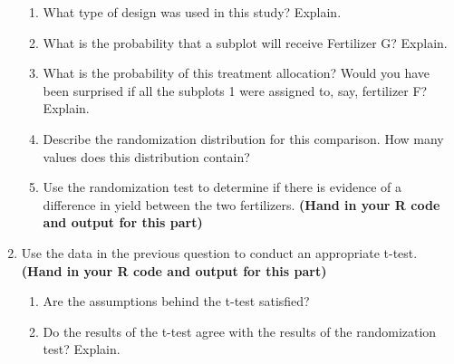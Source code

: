 \documentclass[11pt, oneside]{article}   	%
\begin{document}
\begin{enumerate}
\begin{enumerate}
\item What type of design was used in this study?  Explain.
\item What is the probability that a subplot will receive Fertilizer G?  Explain.
\item What is the probability of this treatment allocation?  Would you have been surprised if all the subplots 1 were assigned to, say, fertilizer F?  Explain.
\item Describe the randomization distribution for this comparison.  How many values does this distribution contain?
\item Use the randomization test to determine if there is evidence of a difference in yield between the two fertilizers.  {\bf (Hand in your R code and output for this part)}
\end{enumerate}

\item Use the data in the previous question to conduct an appropriate t-test.  {\bf (Hand in your R code and output for this part)}


\begin{enumerate}

\item Are the assumptions behind the t-test satisfied?  
\item Do the results of the t-test agree with the results of the randomization test?  Explain. 


\end{enumerate}

\end {enumerate}
\end{document}
